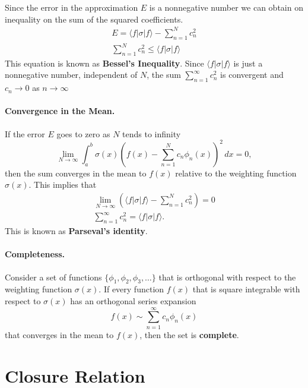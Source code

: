 Since the error in the approximation $E$ is a nonnegative number we can
obtain on inequality on the sum of the squared coefficients.
\begin{gather*}
  E = \langle f | \sigma | f \rangle - \sum_{n=1}^N c_n^2 \\
  \boxed{ \sum_{n=1}^N c_n^2 \leq \langle f | \sigma | f \rangle }
\end{gather*}
This equation is known as \textbf{Bessel's Inequality}.
Since $\langle f | \sigma | f \rangle$ is just a nonnegative number, independent
of $N$, the sum $\sum_{n = 1}^\infty c_n^2$ is convergent and $c_n \to 0$ as 
$n \to \infty$

\paragraph{Convergence in the Mean.}
If the error $E$ goes to zero as $N$ tends to infinity
\[ 
\lim_{N \to \infty} \int_a^b \sigma(x) \left( f(x) - \sum_{n=1}^N c_n \phi_n(x) \right)^2 \, d x = 0,
\]
then the sum converges in the mean to $f(x)$ relative to the weighting 
function $\sigma(x)$.  This implies that
\begin{gather*}
  \lim_{N \to \infty} \left( \langle f | \sigma | f \rangle - \sum_{n=1}^N c_n^2 \right) = 0 
  \\
  \boxed{
    \sum_{n = 1}^\infty c_n^2 = \langle f | \sigma | f \rangle.
    }
\end{gather*}
This is known as \textbf{Parseval's identity}.

\paragraph{Completeness.}
Consider a set of functions $\{ \phi_1, \phi_2, \phi_3, \ldots\}$ that is
orthogonal with respect to the weighting function $\sigma(x)$.
If every function $f(x)$ that is square integrable with respect to
$\sigma(x)$ has an orthogonal series expansion
\[ f(x) \sim \sum_{n = 1}^\infty c_n \phi_n(x) \]
that converges in the mean to $f(x)$, then the set is \textbf{complete}.






\section{Closure Relation}


